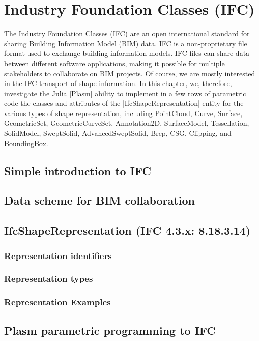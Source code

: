 

\chapter{Industry Foundation Classes (IFC)}
\label{chapt:10}

The Industry Foundation Classes (IFC) are an open international standard for sharing Building Information Model (BIM) data.
IFC is a non-proprietary file format used to exchange building information models. IFC files can share data between different software applications, making it possible for multiple stakeholders to collaborate on BIM projects. Of course, we are mostly interested in the IFC transport of shape information.
In this chapter, we, therefore, investigate the Julia |Plasm| ability to implement in a few rows of parametric code the classes and attributes of the |IfcShapeRepresentation|
entity for the various types of shape representation, including PointCloud, Curve, Surface, GeometricSet, GeometricCurveSet, Annotation2D, SurfaceModel, Tessellation, SolidModel, SweptSolid, AdvancedSweptSolid, Brep, CSG, Clipping, and BoundingBox. 

\section{Simple introduction to IFC}\label{sect:10-1}


\section{Data scheme for BIM collaboration}\label{sect:10-2}


\section{IfcShapeRepresentation (IFC 4.3.x: 8.18.3.14)}\label{sect:10-3}

\subsection{Representation identifiers}\label{sect:10-3-1}


\subsection{Representation types}\label{sect:10-3-2}


\subsection{Representation Examples}\label{sect:10-3-3}




\section{Plasm parametric programming to IFC}\label{sect:10-4}



